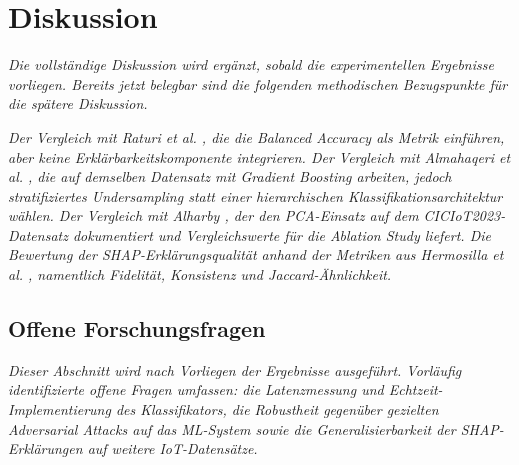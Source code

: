 \section{Diskussion}\label{diskussion}

\textit{Die vollständige Diskussion wird ergänzt, sobald die experimentellen Ergebnisse vorliegen. Bereits jetzt belegbar sind die folgenden methodischen Bezugspunkte für die spätere Diskussion.}

\textit{Der Vergleich mit Raturi et al. \cite{raturi2026exploratory}, die die Balanced Accuracy als Metrik einführen, aber keine Erklärbarkeitskomponente integrieren. Der Vergleich mit Almahaqeri et al. \cite{almahaqeri2026gradient}, die auf demselben Datensatz mit Gradient Boosting arbeiten, jedoch stratifiziertes Undersampling statt einer hierarchischen Klassifikationsarchitektur wählen. Der Vergleich mit Alharby \cite{alharby2025ciciot}, der den PCA-Einsatz auf dem CICIoT2023-Datensatz dokumentiert und Vergleichswerte für die Ablation Study liefert. Die Bewertung der SHAP-Erklärungsqualität anhand der Metriken aus Hermosilla et al. \cite{hermosilla2025xai_forensic}, namentlich Fidelität, Konsistenz und Jaccard-Ähnlichkeit.}

\subsection*{Offene Forschungsfragen}

\textit{Dieser Abschnitt wird nach Vorliegen der Ergebnisse ausgeführt. Vorläufig identifizierte offene Fragen umfassen: die Latenzmessung und Echtzeit-Implementierung des Klassifikators, die Robustheit gegenüber gezielten Adversarial Attacks auf das ML-System sowie die Generalisierbarkeit der SHAP-Erklärungen auf weitere IoT-Datensätze.}
